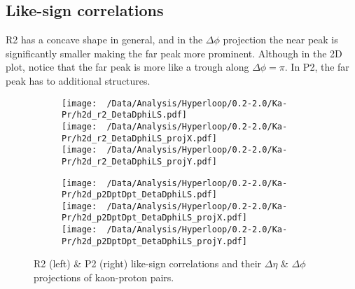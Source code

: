\documentclass[12pt,a4paper,twoside]{report}
\begin{document}
\subsection{Like-sign correlations}
R2 has a concave shape in general, and in the $\Delta\phi$ projection the near peak is significantly smaller making the far peak more prominent. Although in the 2D plot, notice that the far peak is more like a trough along $\Delta\phi=\pi$. In P2, the far peak has to additional structures.
\begin{figure}[H]
	\begin{subfigure}{0.49\linewidth}
		\texttt{[image: ~/Data/Analysis/Hyperloop/0.2-2.0/Ka-Pr/h2d\_r2\_DetaDphiLS.pdf]}\\
		\texttt{[image: ~/Data/Analysis/Hyperloop/0.2-2.0/Ka-Pr/h2d\_r2\_DetaDphiLS\_projX.pdf]}\\
		\texttt{[image: ~/Data/Analysis/Hyperloop/0.2-2.0/Ka-Pr/h2d\_r2\_DetaDphiLS\_projY.pdf]}\\
	\end{subfigure}
	\begin{subfigure}{0.49\linewidth}
		\texttt{[image: ~/Data/Analysis/Hyperloop/0.2-2.0/Ka-Pr/h2d\_p2DptDpt\_DetaDphiLS.pdf]}\\
		\texttt{[image: ~/Data/Analysis/Hyperloop/0.2-2.0/Ka-Pr/h2d\_p2DptDpt\_DetaDphiLS\_projX.pdf]}\\
		\texttt{[image: ~/Data/Analysis/Hyperloop/0.2-2.0/Ka-Pr/h2d\_p2DptDpt\_DetaDphiLS\_projY.pdf]}\\
	\end{subfigure}
	\caption{R2 (left) \& P2 (right) like-sign correlations and their $\Delta\eta$ \& $\Delta\phi$ projections of kaon-proton pairs.}
\end{figure}
\end{document}
